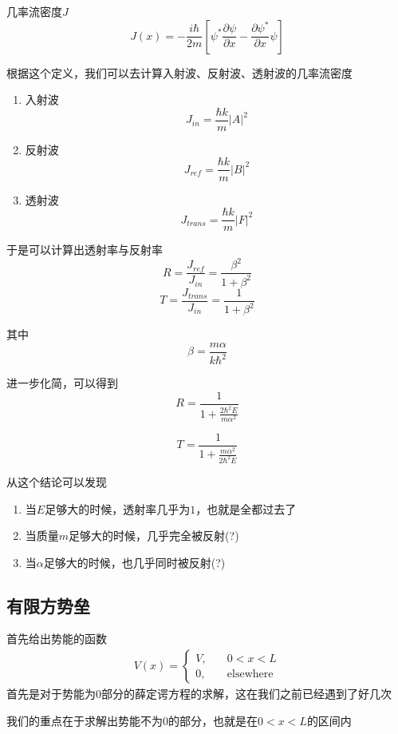 \documentclass{article}
\begin{document}
几率流密度$J$
\[
    J(x)=-\frac{i\hbar}{2m}\left[\psi^{*}\frac{\partial\psi}{\partial x}-\frac{\partial \psi^{*}}{\partial x}\psi\right]
\]

根据这个定义，我们可以去计算入射波、反射波、透射波的几率流密度
\begin{center}
    \begin{enumerate}
        \item 入射波\[J_{in}=\frac{\hbar k}{m}\left|A\right|^2\]
        \item 反射波\[J_{ref}=\frac{\hbar k}{m}\left|B\right|^2\]
        \item 透射波\[J_{trans}=\frac{\hbar k}{m}\left|F\right|^2\]
    \end{enumerate}
\end{center}

于是可以计算出透射率与反射率
\[
    R=\frac{J_{ref}}{J_{in}}=\frac{\beta^2}{1+\beta^2}
\]
\[
    T=\frac{J_{trans}}{J_{in}}=\frac{1}{1+\beta^2}
\]

其中
\[\beta=\frac{m\alpha}{k\hbar^2}\]

进一步化简，可以得到
\[
    R=\frac{1}{1+\frac{2\hbar^2E}{m\alpha^2}}
\]

\[
    T=\frac{1}{1+\frac{m\alpha^2}{2\hbar^2E}}
\]

从这个结论可以发现
\begin{enumerate}
    \item 当$E$足够大的时候，透射率几乎为$1$，也就是全都过去了
    \item 当质量$m$足够大的时候，几乎完全被反射(?)
    \item 当$\alpha$足够大的时候，也几乎同时被反射(?)
\end{enumerate}



\subsection{有限方势垒}

首先给出势能的函数
\begin{align*}
    V(x)=
    \begin{cases}
        V,&\quad0<x<L\\
        0,&\quad\text{elsewhere}
    \end{cases}
\end{align*}
首先是对于势能为$0$部分的薛定谔方程的求解，这在我们之前已经遇到了好几次



我们的重点在于求解出势能不为$0$的部分，也就是在$0<x<L$的区间内
\end{document}
